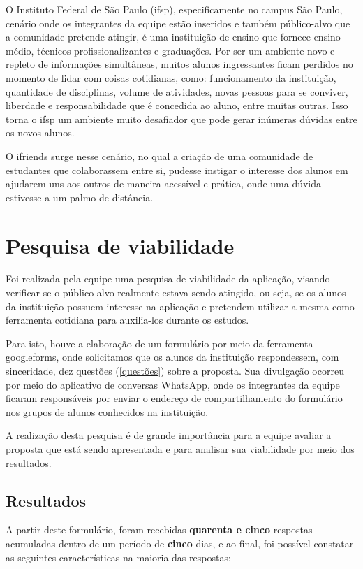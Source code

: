 O Instituto Federal de São Paulo (\acs{ifsp}), especificamente no campus São Paulo, cenário onde os integrantes da equipe estão inseridos e também público-alvo que a comunidade pretende atingir, é uma instituição de ensino que fornece ensino médio, técnicos profissionalizantes e graduações.
Por ser um ambiente novo e repleto de informações simultâneas, muitos alunos ingressantes ficam perdidos no momento de lidar com coisas cotidianas, como: funcionamento da instituição, quantidade de disciplinas, volume de atividades, novas pessoas para se conviver, liberdade e responsabilidade que é concedida ao aluno, entre muitas outras. Isso torna o \acs{ifsp} um ambiente muito desafiador que pode gerar inúmeras dúvidas entre os novos alunos. 

O \gls{ifriends} surge nesse cenário, no qual a criação de uma comunidade de estudantes que colaborassem entre si, pudesse instigar o interesse dos alunos em ajudarem uns aos outros de maneira acessível e prática, onde uma dúvida estivesse a um palmo de distância.

\section{Pesquisa de viabilidade} 
\label{pesquisa}
Foi realizada pela equipe uma pesquisa de viabilidade da aplicação, visando verificar se o público-alvo realmente estava sendo atingido, ou seja, se os alunos da instituição possuem interesse na aplicação e pretendem utilizar a mesma como ferramenta cotidiana para auxilia-los durante os estudos.

Para isto, houve a elaboração de um formulário por meio da ferramenta \gls{googleforms}, onde solicitamos que os alunos da instituição respondessem, com sinceridade, dez questões (\autoref{questões}) sobre a proposta. Sua divulgação ocorreu por meio do aplicativo de conversas \gls{WhatsApp}, onde os integrantes da equipe ficaram responsáveis por enviar o endereço de compartilhamento do formulário nos grupos de alunos conhecidos na instituição.

A realização desta pesquisa é de grande importância para a equipe avaliar a proposta que está sendo apresentada e para analisar sua viabilidade por meio dos resultados.

\subsection{Resultados}
A partir deste formulário, foram recebidas \textbf{quarenta e cinco} respostas acumuladas dentro de um período de \textbf{cinco} dias, e ao final, foi possível constatar as seguintes características na maioria das respostas:


